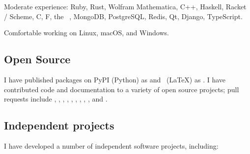 \documentclass{article}
\begin{document}
Moderate experience: Ruby, Rust, Wolfram Mathematica, C++, Haskell,
Racket / Scheme, C\Sharp, F\Sharp, the \dotnet\ \api, MongoDB, PostgreSQL,
Redis, Qt, Django, TypeScript.

Comfortable working on Linux, macOS, and Windows.

\subsection{Open Source}

I have published packages on PyPI (Python) as
\href{https://pypi.org/user/9999years/}{} and \ctan\ (LaTeX)
as \href{https://ctan.org/author/turner}{}. I have contributed
code and documentation to a variety of open source projects; pull requests
include , ,
, ,
, ,
, ,
, and .

\subsection{Independent projects}

I have developed a number of independent software projects, including:
\end{document}
